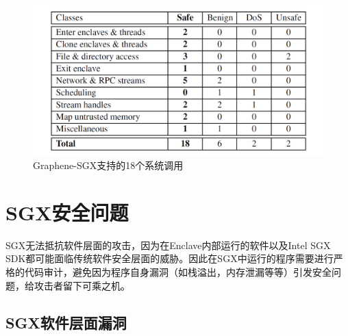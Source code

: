 \documentclass[twocolumn]{source/Paper}
\begin{document}
        \begin{figure}[H]
            \centering
            \includegraphics[width=0.7\linewidth]{pic/graphene.png}
            \caption{Graphene-SGX支持的18个系统调用}
            \label{graphene}
        \end{figure}

    \section{SGX安全问题}

        SGX无法抵抗软件层面的攻击，因为在Enclave内部运行的软件以及Intel SGX SDK都可能面临传统软件安全层面的威胁。因此在SGX中运行的程序需要进行严格的代码审计，避免因为程序自身漏洞（如栈溢出，内存泄漏等等）引发安全问题，给攻击者留下可乘之机。

        \subsection{SGX软件层面漏洞}
\end{document}
